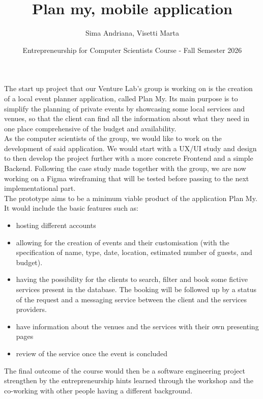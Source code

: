 \documentclass[letterpaper]{article}
\title{Plan my, mobile application}
\author{Sima Andriana, Visetti Marta }
\date{Entrepreneurship for Computer Scientists Course - Fall Semester 2026}
\begin{document}
\maketitle
The start up project that our Venture Lab's group is working on is the creation of a local event planner application, called Plan My. Its main purpose is to simplify the planning of private events by showcasing some local services and venues, so that the client can find all the information about what they need in one place comprehensive of the budget and availability.\\
As the computer scientists of the group, we would like to work on the development of said application. We would start with a UX/UI study and design to then develop the project further with a more concrete Frontend and a simple Backend. 
Following the case study made together with the group, we are now working on a Figma wireframing that will be tested before passing to the next implementational part.\\
The prototype aims to be a minimum viable product of the application Plan My. It would include the basic features such as:
\begin{itemize}
    \item hosting different accounts
    \item allowing for the creation of events and their customisation (with the specification of name, type, date, location, estimated number of guests, and budget).
    \item having the possibility for the clients to search, filter and book some fictive services present in the database. The booking will be followed up by a status of the request and a messaging service between the client and the services providers.
    \item have information about the venues and the services with their own presenting pages
    \item review of the service once the event is concluded 
\end{itemize} 

The final outcome of the course would then be a software engineering project strengthen by the entrepreneurship hints learned through the workshop and the co-working with other people having a different background.  


\end{document}
